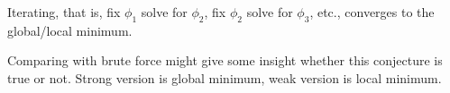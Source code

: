 

\begin{conjecture}
    Iterating, that is, fix $\phi_1$ solve for $\phi_2$, fix $\phi_2$ solve for $\phi_3$, etc., converges to the global/local minimum. 
\end{conjecture}

Comparing with brute force might give some insight whether this conjecture is true or not. Strong version is global minimum, weak version is local minimum. 

